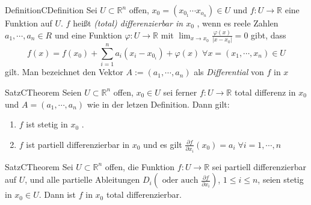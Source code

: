 
%

%
\begin{ibox}[]{Definition}{CDefinition}
    Sei $ U \subset \mathbb{R}^n  $ offen, $ x_0 = \left( x_{0_{1}} \cdots x_{o_{n}}  \right) \in U $ und 
	$ f : U \to \mathbb{R}  $ eine Funktion auf $ U $. $ f $ heißt \textit{(total) differenzierbar in $ x_0 $ }, 
	wenn es reele Zahlen $ a_1, \cdots , a_{n} \in R $ und eine Funktion $ \varphi : U \to \mathbb{R}  $ mit 
$ \lim_{x \to x_0} \frac{\varphi (x)}{|x -x_0|}  = 0 $ gibt, dass
	$$ f(x) = f(x_0) + \sum_{i=1}^{n}a_{i}(x_{i}-x_{0_{i}}) + \varphi(x) \;
	\forall x=\left( x_1, \cdots , x_{n} \right) \in U  $$ 
	gilt. Man bezeichnet den Vektor $ A:=\left( a_1, \cdots, a_{n} \right) $ als \textit{Differential} von $ f \text{ in } x $ 
\end{ibox}
\begin{ibox}[30]{Satz}{CTheorem}
    Seien $ U \subset \mathbb{R}^n  $ offen, $ x_0 \in U $ sei ferner $ f: U \to \mathbb{R}  $ total differenz
	in $ x_0 $ und $ A = \left( a_1, \cdots, a_{n} \right)  $ wie in der letzen Definition. Dann gilt:
	\begin{enumerate}[label=\alph*)]
		\item $ f $ ist stetig in $ x_0 $ .
		\item $ f $ ist partiell differenzierbar in $ x_0 $ und es gilt $ \frac{\partial f}{\partial x_{i}} (x_0) = a_{i} 
			 \; \forall i = 1, \cdots, n $ 
	\end{enumerate}
\end{ibox}
\begin{ibox}[31]{Satz}{CTheorem}
    Sei $ U \subset \mathbb{R}^n  $ offen, die Funktion $ f: U \to \mathbb{R}  $ sei partiell differenzierbar auf 
	$ U $, und alle partielle Ableitungen $ D_i \left( \text{ oder auch }  \frac{\partial f}{\partial x_i} \right)  $,
	 $ 1 \leq i \leq n $, seien stetig in $ x_0 \in U $. Dann ist $ f $ in 
	$ x_0 $ total differenzierbar.
\end{ibox}

